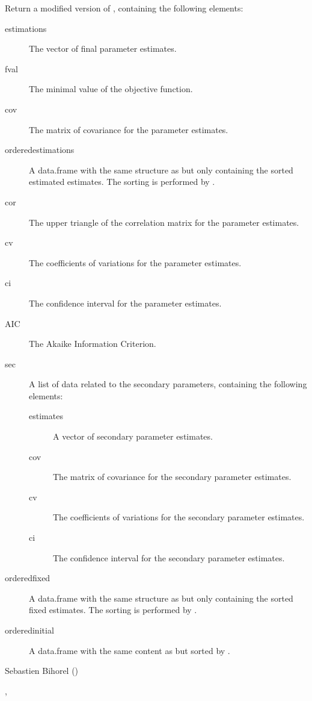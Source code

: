 \begin{Value}
Return a modified version of , containing the following elements:
\begin{description}

\item[estimations] The vector of final parameter estimates.
\item[fval] The minimal value of the objective function.
\item[cov] The matrix of covariance for the parameter estimates.
\item[orderedestimations] A data.frame with the same structure as
 but only containing the sorted estimated estimates.
The sorting is performed by .
\item[cor] The upper triangle of the correlation matrix for the parameter
estimates.
\item[cv] The coefficients of variations for the parameter estimates.
\item[ci] The confidence interval for the parameter estimates.
\item[AIC] The Akaike Information Criterion.
\item[sec] A list of data related to the secondary parameters, containing
the following elements:\begin{description}

\item[estimates] A vector of secondary parameter estimates.
\item[cov] The matrix of covariance for the secondary parameter
estimates.
\item[cv] The coefficients of variations for the secondary parameter
estimates.
\item[ci] The confidence interval for the secondary parameter
estimates.

\end{description}


\item[orderedfixed] A data.frame with the same structure as
 but only containing the sorted fixed estimates.
The sorting is performed by .
\item[orderedinitial] A data.frame with the same content as
 but sorted by .

\end{description}

\end{Value}
%
\begin{Author}\relax
Sebastien Bihorel ()
\end{Author}
%
\begin{SeeAlso}\relax
{},
\end{SeeAlso}
